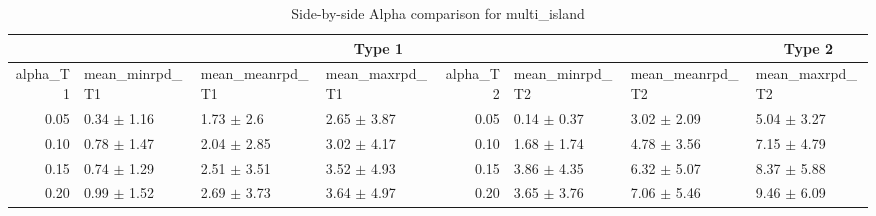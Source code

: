 \begin{table}[ht]
\centering
\begin{tabular}{rlllrlll}
  \multicolumn{7}{c}{Type 1} & \multicolumn{7}{c}{Type 2} \\ 
 \hline
alpha_T1 & mean_minrpd_T1 & mean_meanrpd_T1 & mean_maxrpd_T1 & alpha_T2 & mean_minrpd_T2 & mean_meanrpd_T2 & mean_maxrpd_T2 \\ 
  \hline
0.05 & 0.34 $\pm$ 1.16 & 1.73 $\pm$ 2.6 & 2.65 $\pm$ 3.87 & 0.05 & 0.14 $\pm$ 0.37 & 3.02 $\pm$ 2.09 & 5.04 $\pm$ 3.27 \\ 
  0.10 & 0.78 $\pm$ 1.47 & 2.04 $\pm$ 2.85 & 3.02 $\pm$ 4.17 & 0.10 & 1.68 $\pm$ 1.74 & 4.78 $\pm$ 3.56 & 7.15 $\pm$ 4.79 \\ 
  0.15 & 0.74 $\pm$ 1.29 & 2.51 $\pm$ 3.51 & 3.52 $\pm$ 4.93 & 0.15 & 3.86 $\pm$ 4.35 & 6.32 $\pm$ 5.07 & 8.37 $\pm$ 5.88 \\ 
  0.20 & 0.99 $\pm$ 1.52 & 2.69 $\pm$ 3.73 & 3.64 $\pm$ 4.97 & 0.20 & 3.65 $\pm$ 3.76 & 7.06 $\pm$ 5.46 & 9.46 $\pm$ 6.09 \\ 
   \hline
\end{tabular}
\caption{Side-by-side Alpha comparison for multi_island} 
\end{table}
